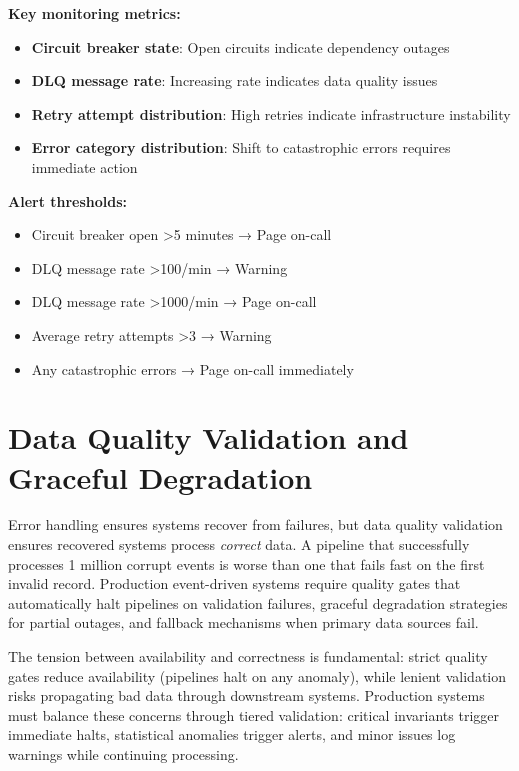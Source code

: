 \textbf{Key monitoring metrics:}
\begin{itemize}
    \item \textbf{Circuit breaker state}: Open circuits indicate dependency outages
    \item \textbf{DLQ message rate}: Increasing rate indicates data quality issues
    \item \textbf{Retry attempt distribution}: High retries indicate infrastructure instability
    \item \textbf{Error category distribution}: Shift to catastrophic errors requires immediate action
\end{itemize}

\textbf{Alert thresholds:}
\begin{itemize}
    \item Circuit breaker open >5 minutes → Page on-call
    \item DLQ message rate >100/min → Warning
    \item DLQ message rate >1000/min → Page on-call
    \item Average retry attempts >3 → Warning
    \item Any catastrophic errors → Page on-call immediately
\end{itemize}

\section{Data Quality Validation and Graceful Degradation}

Error handling ensures systems recover from failures, but data quality validation ensures recovered systems process \textit{correct} data. A pipeline that successfully processes 1 million corrupt events is worse than one that fails fast on the first invalid record. Production event-driven systems require quality gates that automatically halt pipelines on validation failures, graceful degradation strategies for partial outages, and fallback mechanisms when primary data sources fail.

The tension between availability and correctness is fundamental: strict quality gates reduce availability (pipelines halt on any anomaly), while lenient validation risks propagating bad data through downstream systems. Production systems must balance these concerns through tiered validation: critical invariants trigger immediate halts, statistical anomalies trigger alerts, and minor issues log warnings while continuing processing.

